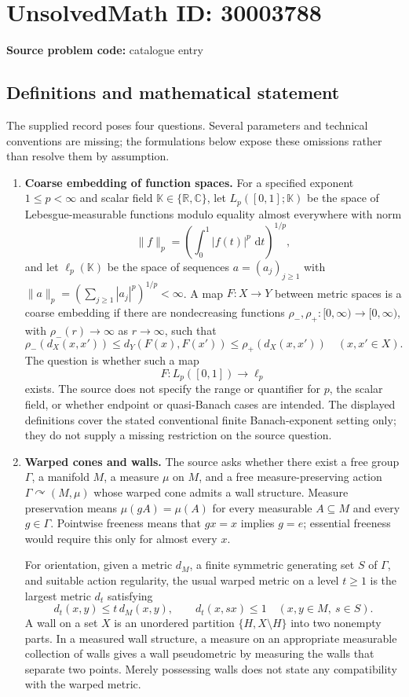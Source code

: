 \documentclass[11pt]{article}
\newcommand{\R}{\mathbb{R}}
\newcommand{\C}{\mathbb{C}}
\newcommand{\dd}{\,\mathrm{d}}
\begin{document}
\section*{UnsolvedMath ID: 30003788}
\textbf{Source problem code:} catalogue entry
\subsection{Definitions and mathematical statement}
The supplied record poses four questions. Several parameters and technical conventions are missing; the formulations below expose these omissions rather than resolve them by assumption.

\begin{enumerate}
\item \textbf{Coarse embedding of function spaces.} For a specified exponent \(1\leq p<\infty\) and scalar field \(\mathbb K\in\{\R,\C\}\), let \(L_p([0,1];\mathbb K)\) be the space of Lebesgue-measurable functions modulo equality almost everywhere with norm
\[
\|f\|_p=\left(\int_0^1 |f(t)|^p\,\dd t\right)^{1/p},
\]
and let \(\ell_p(\mathbb K)\) be the space of sequences \(a=(a_j)_{j\geq1}\) with \(\|a\|_p=(\sum_{j\geq1}|a_j|^p)^{1/p}<\infty\). A map \(F:X\to Y\) between metric spaces is a coarse embedding if there are nondecreasing functions \(\rho_-,\rho_+:[0,\infty)\to[0,\infty)\), with \(\rho_-(r)\to\infty\) as \(r\to\infty\), such that
\[
\rho_-(d_X(x,x'))\leq d_Y(F(x),F(x'))\leq\rho_+(d_X(x,x'))
\quad(x,x'\in X).
\]
The question is whether such a map
\[
F:L_p([0,1])\longrightarrow\ell_p
\]
exists. The source does not specify the range or quantifier for \(p\), the scalar field, or whether endpoint or quasi-Banach cases are intended. The displayed definitions cover the stated conventional finite Banach-exponent setting only; they do not supply a missing restriction on the source question.

\item \textbf{Warped cones and walls.} The source asks whether there exist a free group \(\Gamma\), a manifold \(M\), a measure \(\mu\) on \(M\), and a free measure-preserving action \(\Gamma\curvearrowright(M,\mu)\) whose warped cone admits a wall structure. Measure preservation means \(\mu(gA)=\mu(A)\) for every measurable \(A\subseteq M\) and every \(g\in\Gamma\). Pointwise freeness means that \(gx=x\) implies \(g=e\); essential freeness would require this only for almost every \(x\).

For orientation, given a metric \(d_M\), a finite symmetric generating set \(S\) of \(\Gamma\), and suitable action regularity, the usual warped metric on a level \(t\geq1\) is the largest metric \(d_t\) satisfying
\[
d_t(x,y)\leq t\,d_M(x,y),\qquad d_t(x,sx)\leq1
\quad(x,y\in M,\ s\in S).
\]
A wall on a set \(X\) is an unordered partition \(\{H,X\setminus H\}\) into two nonempty parts. In a measured wall structure, a measure on an appropriate measurable collection of walls gives a wall pseudometric by measuring the walls that separate two points. Merely possessing walls does not state any compatibility with the warped metric.


\end{enumerate}
\end{document}
